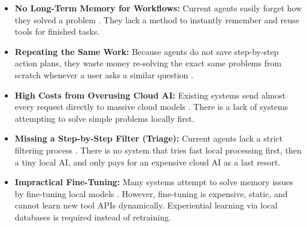 \begin{itemize}
    \item \textbf{No Long-Term Memory for Workflows:} Current agents easily forget how they solved a problem \cite{ai_agent-memory}. They lack a method to instantly remember and reuse tools for finished tasks.
    \item \textbf{Repeating the Same Work:} Because agents do not save step-by-step action plans, they waste money re-solving the exact same problems from scratch whenever a user asks a similar question \cite{claude_code_dive, token_economics}.
    \item \textbf{High Costs from Overusing Cloud AI:} Existing systems send almost every request directly to massive cloud models \cite{ai_tokenomics}. There is a lack of systems attempting to solve simple problems locally first.
    \item \textbf{Missing a Step-by-Step Filter (Triage):} Current agents lack a strict filtering process \cite{marginal_token}. There is no system that tries fast local processing first, then a tiny local AI, and only pays for an expensive cloud AI as a last resort.
    \item \textbf{Impractical Fine-Tuning:} Many systems attempt to solve memory issues by fine-tuning local models \cite{agent_survey}. However, fine-tuning is expensive, static, and cannot learn new tool APIs dynamically. Experiential learning via local databases is required instead of retraining.
\end{itemize}

